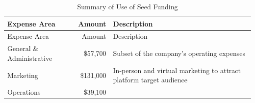 \documentclass[10pt,openany]{book}
\begin{document}
\begin{longtable}[]{@{}lrl@{}}
\caption{Summary of Use of Seed Funding}\tabularnewline
\toprule
\begin{minipage}[b]{0.28\columnwidth}\raggedright
Expense Area\strut
\end{minipage} & \begin{minipage}[b]{0.13\columnwidth}\raggedleft
Amount\strut
\end{minipage} & \begin{minipage}[b]{0.50\columnwidth}\raggedright
Description\strut
\end{minipage}\tabularnewline
\midrule
\endfirsthead
\toprule
\begin{minipage}[b]{0.28\columnwidth}\raggedright
Expense Area\strut
\end{minipage} & \begin{minipage}[b]{0.13\columnwidth}\raggedleft
Amount\strut
\end{minipage} & \begin{minipage}[b]{0.50\columnwidth}\raggedright
Description\strut
\end{minipage}\tabularnewline
\midrule
\endhead
\begin{minipage}[t]{0.28\columnwidth}\raggedright
General \& Administrative\strut
\end{minipage} & \begin{minipage}[t]{0.13\columnwidth}\raggedleft
\$57,700\strut
\end{minipage} & \begin{minipage}[t]{0.50\columnwidth}\raggedright
Subset of the company's operating expenses\strut
\end{minipage}\tabularnewline
\begin{minipage}[t]{0.28\columnwidth}\raggedright
Marketing\strut
\end{minipage} & \begin{minipage}[t]{0.13\columnwidth}\raggedleft
\$131,000\strut
\end{minipage} & \begin{minipage}[t]{0.50\columnwidth}\raggedright
In-person and virtual marketing to attract platform target
audience\strut
\end{minipage}\tabularnewline
\begin{minipage}[t]{0.28\columnwidth}\raggedright
Operations\strut
\end{minipage} & \begin{minipage}[t]{0.13\columnwidth}\raggedleft
\$39,100\strut
\end{minipage} & \begin{minipage}[t]{0.50\columnwidth}\raggedright

\end{minipage}
\end{longtable}
\end{document}
